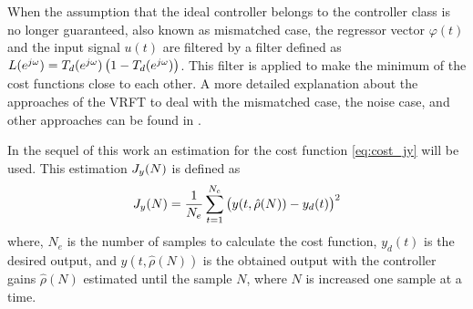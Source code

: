 When the assumption that the ideal controller belongs to the controller class is no longer guaranteed, also known as mismatched case, the regressor vector $\varphi(t)$ and the input signal $u(t)$ are filtered by a filter defined as $L(e^{j\omega}) = T_d(e^{j\omega}) \left( 1- T_d(e^{j\omega}) \right)$.
This filter is applied to make the minimum of the cost functions close to each other.
A more detailed explanation about the approaches of the VRFT to deal with the mismatched case, the noise case, and other approaches can be found in \cite{bazanella2011data}.

In the sequel of this work an estimation for the cost function \eqref{eq:cost_jy} will be used.
This estimation $J_y(N)$ is defined as
\begin{equation}
	J_y(N) = \frac{1}{N_e} \sum \limits_{t=1}^{N_e} \left( y(t, \hat{\rho}(N)) - y_d(t) \right)^2
\label{eq:jy}
\end{equation}
where, $N_e$ is the number of samples to calculate the cost function, $y_d(t)$ is the desired output, and $y(t, \hat{\rho}(N))$ is the obtained output with the controller gains $\hat{\rho}(N)$ estimated until the sample $N$, where $N$ is increased one sample at a time.





%
%
%
%
%

